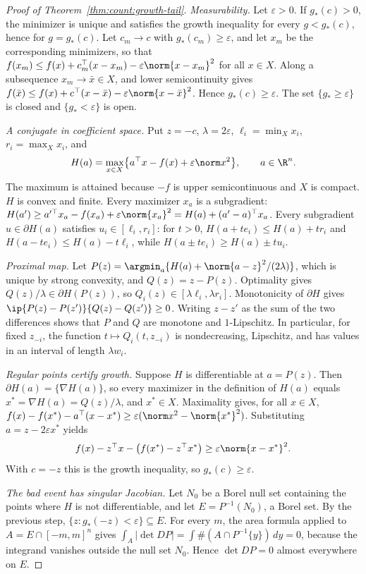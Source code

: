 \begin{proof}[Proof of Theorem~\ref{thm:count:growth-tail}]
\emph{Measurability.} Let $\varepsilon>0$. If $g_*(c)>0$, the minimizer is
unique and satisfies the growth inequality for every $g<g_*(c)$, hence for
$g=g_*(c)$. Let $c_m\to c$ with $g_*(c_m)\ge\varepsilon$, and let $x_m$ be the
corresponding minimizers, so that
$f(x_m)\le f(x)+c_m^\top(x-x_m)-\varepsilon\norm{x-x_m}^2$ for all $x\in X$.
Along a subsequence $x_m\to\bar x\in X$, and lower semicontinuity gives
$f(\bar x)\le f(x)+c^\top(x-\bar x)-\varepsilon\norm{x-\bar x}^2$. Hence
$g_*(c)\ge\varepsilon$. The set $\{g_*\ge\varepsilon\}$ is closed and
$\{g_*<\varepsilon\}$ is open.

\emph{A conjugate in coefficient space.} Put $z=-c$, $\lambda=2\varepsilon$,
$\ell_i=\min_Xx_i$, $r_i=\max_Xx_i$, and
\[
 H(a)=\max_{x\in X}\bigl\{a^\top x-f(x)+\varepsilon\norm x^2\bigr\},
 \qquad a\in\R^n .
\]
The maximum is attained because $-f$ is upper semicontinuous and $X$ is
compact. $H$ is convex and finite. Every maximizer $x_a$ is a subgradient:
$H(a')\ge a'^\top x_a-f(x_a)+\varepsilon\norm{x_a}^2=H(a)+(a'-a)^\top x_a$.
Every subgradient $u\in\partial H(a)$ satisfies $u_i\in[\ell_i,r_i]$: for
$t>0$, $H(a+te_i)\le H(a)+tr_i$ and $H(a-te_i)\le H(a)-t\ell_i$, while
$H(a\pm te_i)\ge H(a)\pm tu_i$.

\emph{Proximal map.} Let
$P(z)=\argmin_a\{H(a)+\norm{a-z}^2/(2\lambda)\}$, which is unique by strong
convexity, and $Q(z)=z-P(z)$. Optimality gives $Q(z)/\lambda\in\partial H(P(z))$,
so $Q_i(z)\in[\lambda\ell_i,\lambda r_i]$. Monotonicity of $\partial H$ gives
$\ip{P(z)-P(z')}{Q(z)-Q(z')}\ge0$. Writing $z-z'$ as the sum of the two
differences shows that $P$ and $Q$ are monotone and $1$-Lipschitz. In
particular, for fixed $z_{-i}$, the function $t\mapsto Q_i(t,z_{-i})$ is
nondecreasing, Lipschitz, and has values in an interval of length
$\lambda w_i$.

\emph{Regular points certify growth.} Suppose $H$ is differentiable at
$a=P(z)$. Then $\partial H(a)=\{\nabla H(a)\}$, so every maximizer in the
definition of $H(a)$ equals $x^*=\nabla H(a)=Q(z)/\lambda$, and $x^*\in X$.
Maximality gives, for all $x\in X$,
$f(x)-f(x^*)-a^\top(x-x^*)\ge\varepsilon(\norm x^2-\norm{x^*}^2)$. Substituting
$a=z-2\varepsilon x^*$ yields
\[
 f(x)-z^\top x-\bigl(f(x^*)-z^\top x^*\bigr)\ge\varepsilon\norm{x-x^*}^2 .
\]
With $c=-z$ this is the growth inequality, so $g_*(c)\ge\varepsilon$.

\emph{The bad event has singular Jacobian.} Let $N_0$ be a Borel null set
containing the points where $H$ is not differentiable, and let
$E=P^{-1}(N_0)$, a Borel set. By the previous step,
$\{z:g_*(-z)<\varepsilon\}\subseteq E$. For every $m$, the area formula
applied to $A=E\cap[-m,m]^n$ gives
$\int_A|\det DP|=\int\#(A\cap P^{-1}\{y\})\,dy=0$, because the integrand
vanishes outside the null set $N_0$. Hence $\det DP=0$ almost everywhere on
$E$.


\end{proof}
